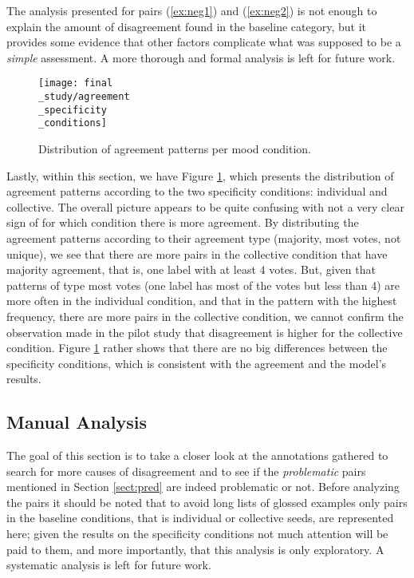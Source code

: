 The analysis presented for pairs (\ref{ex:neg1}) and (\ref{ex:neg2}) is not enough to explain the amount of disagreement found in the baseline category, but it provides some evidence that other factors complicate what was supposed to be a \textit{simple} assessment. A more thorough and formal analysis is left for future work.\\

\begin{figure}
\parbox{15cm}{\texttt{[image: final\\\_study/agreement\\\_specificity\\\_conditions]}
\caption{Distribution of agreement patterns per mood condition.}\label{fig:specpat}}
\qquad
\end{figure}

Lastly, within this section, we have Figure \ref{fig:specpat}, which presents the distribution of agreement patterns according to the two specificity conditions: individual and collective. The overall picture appears to be quite confusing with not a very clear sign of for which condition there is more agreement. By distributing the agreement patterns according to their agreement type (majority, most votes, not unique), we see that there are more pairs in the collective condition that have majority agreement, that is, one label with at least 4 votes. But, given that patterns of type most votes (one label has most of the votes but less than 4) are more often in the individual condition, and that in the pattern with the highest frequency, there are more pairs in the collective condition, we cannot confirm the observation made in the pilot study that disagreement is higher for the collective condition. Figure \ref{fig:specpat} rather shows that there are no big differences between the specificity conditions, which is consistent with the agreement and the model's results.\\

\subsection{Manual Analysis}
\label{subsect:man}

The goal of this section is to take a closer look at the annotations gathered to search for more causes of disagreement and to see if the \textit{problematic} pairs mentioned in Section \ref{sect:pred} are indeed problematic or not. Before analyzing the pairs it should be noted that to avoid long lists of glossed examples only pairs in the baseline conditions, that is individual or collective seeds, are represented here; given the results on the specificity conditions not much attention will be paid to them, and more importantly, that this analysis is only exploratory. A systematic analysis is left for future work.\\ 

